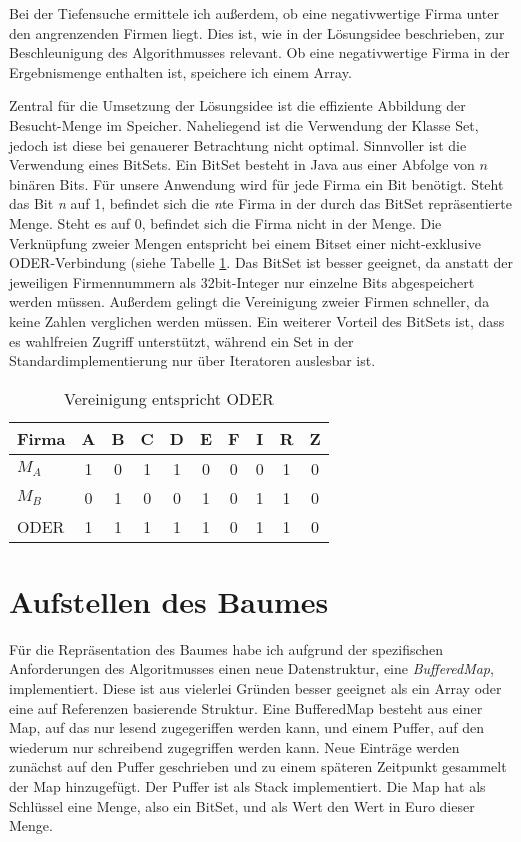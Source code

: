 Bei der Tiefensuche ermittele ich außerdem, ob eine negativwertige Firma unter den angrenzenden Firmen liegt. Dies ist, wie in der Lösungsidee beschrieben, zur Beschleunigung des Algorithmusses relevant. Ob eine negativwertige Firma in der Ergebnismenge enthalten ist, speichere ich einem Array.

Zentral für die Umsetzung der Lösungsidee ist die effiziente Abbildung der Besucht-Menge im Speicher. Naheliegend ist die Verwendung der Klasse Set, jedoch ist diese bei genauerer Betrachtung nicht optimal. Sinnvoller ist die Verwendung eines BitSets. Ein BitSet besteht in Java aus einer Abfolge von \(n\) binären Bits. Für unsere Anwendung wird für jede Firma ein Bit benötigt.
Steht das Bit \textit{n} auf 1, befindet sich die \textit{n}te Firma in der durch das BitSet repräsentierte Menge. Steht es auf 0, befindet sich die Firma nicht in der Menge.
Die Verknüpfung zweier Mengen entspricht bei einem Bitset einer nicht-exklusive ODER-Verbindung (siehe Tabelle \ref{tab:veroder}.
Das BitSet ist besser geeignet, da anstatt der jeweiligen Firmennummern als 32bit-Integer nur einzelne Bits abgespeichert werden müssen. Außerdem gelingt die Vereinigung zweier Firmen schneller, da keine Zahlen verglichen werden müssen. Ein weiterer Vorteil des BitSets ist, dass es wahlfreien Zugriff unterstützt, während ein Set in der Standardimplementierung nur über Iteratoren auslesbar ist.
\begin{table}
	\centering
    \begin{tabular}{l|ccccccccc}
    Firma 	& A & B & C & D & E & F & I & R & Z \\ \hline
    \(M_A\)	& 1 & 0 & 1 & 1 & 0 & 0 & 0 & 1 & 0 \\
    \(M_B\)	& 0 & 1 & 0 & 0 & 1 & 0 & 1 & 1 & 0 \\ \hhline{=|*{9}{=}}
    ODER 	& 1 & 1 & 1 & 1 & 1 & 0 & 1 & 1 & 0 \\
    \end{tabular}
    \caption {Vereinigung entspricht ODER}
    \label{tab:veroder}
\end{table}

\section{Aufstellen des Baumes}
Für die Repräsentation des Baumes habe ich aufgrund der spezifischen Anforderungen des Algoritmusses einen neue Datenstruktur, eine \textit{BufferedMap}, implementiert. Diese ist aus vielerlei Gründen besser geeignet als ein Array oder eine auf Referenzen basierende Struktur.
Eine BufferedMap besteht aus einer Map, auf das nur lesend zugegeriffen werden kann, und einem Puffer, auf den wiederum nur schreibend zugegriffen werden kann. Neue Einträge werden zunächst auf den Puffer geschrieben und zu einem späteren Zeitpunkt gesammelt der Map hinzugefügt. Der Puffer ist als Stack implementiert. Die Map hat als Schlüssel eine Menge, also ein BitSet, und als Wert den Wert in Euro dieser Menge.

